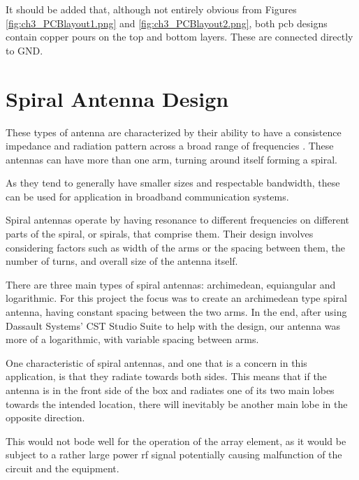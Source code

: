 \par It should be added that, although not entirely obvious from Figures \ref{fig:ch3_PCBlayout1.png} and \ref{fig:ch3_PCBlayout2.png}, both \ac{pcb} designs contain copper pours on the top and bottom layers. These are connected directly to GND.

\section{Spiral Antenna Design}
\par These types of antenna are characterized by their ability to have a consistence impedance and radiation pattern across a broad range of frequencies \cite{ConstantineA.Balanis2016AntennaDesign}. These antennas can have more than one arm, turning around itself forming a spiral. 

\par As they tend to generally have smaller sizes and respectable bandwidth, these can be used for application in broadband communication systems.

\par Spiral antennas operate by having resonance to different frequencies on different parts of the spiral, or spirals, that comprise them. Their design involves considering factors such as width of the arms or the spacing between them, the number of turns, and overall size of the antenna itself.

\par There are three main types of spiral antennas: archimedean, equiangular and logarithmic. For this project the focus was to create an archimedean type spiral antenna, having constant spacing between the two arms. In the end, after using Dassault Systems' CST Studio Suite to help with the design, our antenna was more of a logarithmic, with variable spacing between arms.

\par One characteristic of spiral antennas, and one that is a concern in this application, is that they radiate towards both sides. This means that if the antenna is in the front side of the box and radiates one of its two main lobes towards the intended location, there will inevitably be another main lobe in the opposite direction. 

\par This would not bode well for the operation of the array element, as it would be subject to a rather large power \ac{rf} signal potentially causing malfunction of the circuit and the equipment.

